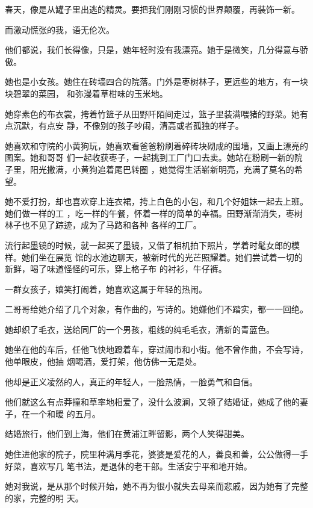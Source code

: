 \documentclass[12pt,a4paper]{article}
\begin{document}
		春天，像是从罐子里出逃的精灵。要把我们刚刚习惯的世界颠覆，再装饰一新。

		而激动慌张的我，语无伦次。

	\endwriting



		他们都说，我们长得像，只是，她年轻时没有我漂亮。她于是微笑，几分得意与骄傲。

		她也是小女孩。她住在砖墙四合的院落。门外是枣树林子，更远些的地方，有一块块碧翠的菜园，
	和弥漫着草柑味的玉米地。

		她穿素色的布衣裳，挎着竹篮子从田野阡陌间走过，篮子里装满喂猪的野菜。她有点沉默，有点安
	静，不像别的孩子吵闹，清高或者孤独的样子。


		她喜欢和守院的小黄狗玩，她喜欢看爸爸粉刷着碎砖块砌成的围墙，又画上漂亮的图案。她和哥哥
	们一起收获枣子，一起挑到工厂门口去卖。她站在粉刷一新的院子里，阳光撒满，小黄狗追着尾巴转圈
	，她觉得生活崭新明亮，充满了莫名的希望。


		她不爱打扮，却也喜欢穿上连衣裙，挎上白色的小包，和几个好姐妹一起去上班。她们做一样的工
	，吃一样的午餐，怀着一样的简单的幸福。田野渐渐消失，枣树林子也不见了踪迹，成为了马路和各种
	各样的工厂。


		流行起墨镜的时候，就一起买了墨镜，又借了相机拍下照片，学着时髦女郎的模样。她们坐在展览
	馆的水池边聊天，被新时代的光芒照耀着。她们尝试着一切的新鲜，喝了味道怪怪的可乐，穿上格子布
	的衬衫，牛仔裤。


		一群女孩子，嬉笑打闹着，她喜欢这属于年轻的热闹。

		二哥哥给她介绍了几个对象，有作曲的，写诗的。她嫌他们不踏实，都一一回绝。

		她却织了毛衣，送给同厂的一个男孩，粗线的纯毛毛衣，清新的青蓝色。

		她坐在他的车后，任他飞快地蹬着车，穿过闹市和小街。他不曾作曲，不会写诗，他单眼皮，他抽
	烟喝酒，爱打架，他仿佛一无是处。

		他却是正义凌然的人，真正的年轻人，一脸热情，一脸勇气和自信。


		他们就这么有点莽撞和草率地相爱了，没什么波澜，又领了结婚证，她成了他的妻子，在一个和暖
	的五月。

		结婚旅行，他们到上海，他们在黄浦江畔留影，两个人笑得甜美。

		她住进他家的院子，院里种满月季花，婆婆是爱花的人，善良和善，公公做得一手好菜，喜欢写几
	笔书法，是退休的老干部。生活安宁平和地开始。

		她对我说，是从那个时候开始，她不再为很小就失去母亲而悲戚，因为她有了完整的家，完整的明
	天。
\end{document}
